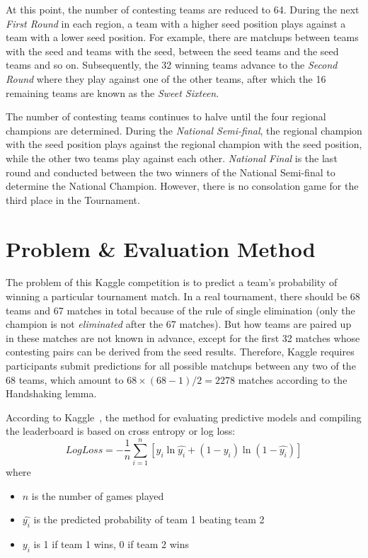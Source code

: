 At this point, the number of contesting teams are reduced to 64. During the next \emph{First Round} in each region, a team with a higher seed position plays against a team with a lower seed position. For example, there are matchups between teams with the  seed and teams with the  seed, between the  seed teams and the  seed teams and so on. Subsequently, the 32 winning teams advance to the \emph{Second Round} where they play against one of the other teams, after which the 16 remaining teams are known as the \emph{Sweet Sixteen}. 

The number of contesting teams continues to halve until the four regional champions are determined. During the \emph{National Semi-final}, the regional champion with the  seed position plays against the regional champion with the  seed position, while the other two teams play against each other. \emph{National Final} is the last round and conducted between the two winners of the National Semi-final to determine the National Champion. However, there is no consolation game for the third place in the Tournament.

\section{Problem \& Evaluation Method}
The problem of this Kaggle competition is to predict a team's probability of winning a particular tournament match. In a real tournament, there should be 68 teams and 67 matches in total because of the rule of single elimination (only the champion is not \emph{eliminated} after the 67 matches). But how teams are paired up in these matches are not known in advance, except for the first 32 matches whose contesting pairs can be derived from the seed results. Therefore, Kaggle requires participants submit predictions for all possible matchups between any two of the 68 teams, which amount to $68 \times (68 - 1) / 2 = 2278$ matches according to the Handshaking lemma. 

According to Kaggle~\cite{KG16}, the method for evaluating predictive models and compiling the leaderboard is based on cross entropy or log loss:
\begin{equation}
LogLoss = -\frac{1}{n}\sum_{i=1}^{n}[y_{i}\ln{\hat{y_{i}}} + (1 - y_{i})\ln(1 - \hat{y_{i}})]
\end{equation}
where
\begin{itemize}
	\item $n$ is the number of games played 
	\item $\hat{y_{i}}$ is the predicted probability of team 1 beating team 2
	\item $y_{i}$ is 1 if team 1 wins, 0 if team 2 wins
\end{itemize}


